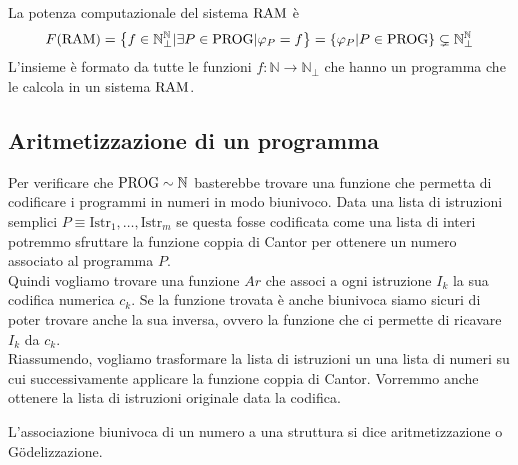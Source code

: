 La potenza computazionale del sistema $\text{RAM}$ è 
$$ F(\text{RAM}) = \left\{f \in \mathbb{N}^{\mathbb{N}}_\bot | \exists P \in \text{PROG} | \varphi_P = f \right\} = \left\{\varphi_P | P \in \text{PROG} \right\} \subsetneq \mathbb{N}^{\mathbb{N}}_\bot $$
L'insieme è formato da tutte le funzioni $f: \mathbb{N} \rightarrow \mathbb{N}_\bot$ che hanno un programma che le calcola in un sistema $\text{RAM}$.\\

\subsection{Aritmetizzazione di un programma}

Per verificare che $\text{PROG} \sim \mathbb{N}$ basterebbe trovare una funzione che permetta di codificare i programmi in numeri in modo biunivoco. Data una lista di istruzioni semplici $P \equiv \text{Istr}_1, \dots, \text{Istr}_m$ se questa fosse codificata come una lista di interi potremmo sfruttare la funzione coppia di Cantor per ottenere un numero associato al programma $P$.\\

Quindi vogliamo trovare una funzione $Ar$ che associ a ogni istruzione $I_k$ la sua codifica numerica $c_k$. Se la funzione trovata è anche biunivoca siamo sicuri di poter trovare anche la sua inversa, ovvero la funzione che ci permette di ricavare $I_k$ da $c_k$.\\

Riassumendo, vogliamo trasformare la lista di istruzioni un una lista di numeri su cui successivamente applicare la funzione coppia di Cantor. Vorremmo anche ottenere la lista di istruzioni originale data la codifica.
\begin{center}
	
\end{center} 
L'associazione biunivoca di un numero a una struttura si dice aritmetizzazione o G\"odelizzazione.\\

